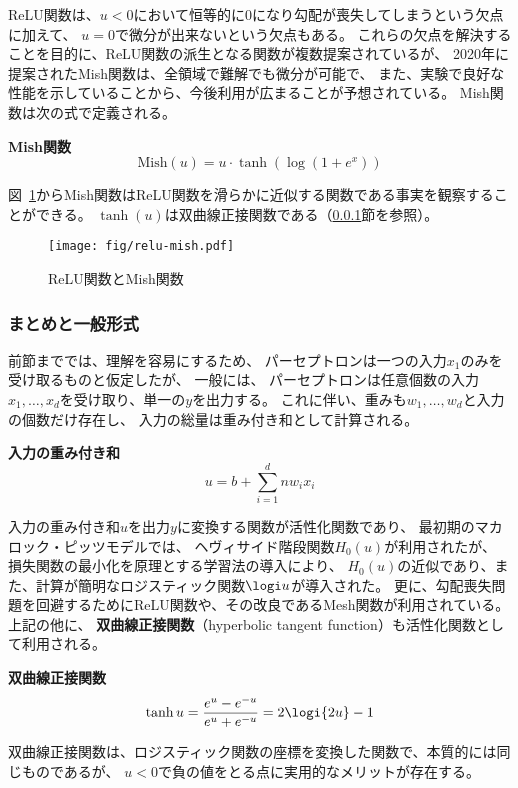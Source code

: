 ReLU関数は、$u < 0$において恒等的に0になり勾配が喪失してしまうという欠点に加えて、
$u = 0$で微分が出来ないという欠点もある。
これらの欠点を解決することを目的に、ReLU関数の派生となる関数が複数提案されているが、
2020年に提案されたMish関数は、全領域で難解でも微分が可能で、
また、実験で良好な性能を示していることから、今後利用が広まることが予想されている。
Mish関数は次の式で定義される。
\begin{itembox}{\bf Mish関数}
\[
  \mathrm{Mish}(u) = u \cdot \tanh\left(\log(1 + e^x)\right)
\]
\end{itembox}
図~\ref{fig:relu-mish}からMish関数はReLU関数を滑らかに近似する関数である事実を観察することができる。
$\tanh(u)$は双曲線正接関数である（\ref{sec:general}節を参照）。

\begin{figure}
  \centering
  \texttt{[image: fig/relu-mish.pdf]}
  \caption{ReLU関数とMish関数}
  \label{fig:relu-mish}
\end{figure}

\subsubsection{まとめと一般形式}
\label{sec:general}

前節まででは、理解を容易にするため、
パーセプトロンは一つの入力$x_1$のみを受け取るものと仮定したが、
一般には、
パーセプトロンは任意個数の入力$x_1, \dots, x_d$を受け取り、単一の$y$を出力する。
これに伴い、重みも$w_1, \dots, w_d$と入力の個数だけ存在し、
入力の総量は重み付き和として計算される。
\begin{itembox}{\bf 入力の重み付き和}
  \[
    u = b + \sum_{i=1}^dn w_i x_i
  \]
\end{itembox}
入力の重み付き和$u$を出力$y$に変換する関数が活性化関数であり、
最初期のマカロック・ピッツモデルでは、
ヘヴィサイド階段関数$H_0(u)$が利用されたが、
損失関数の最小化を原理とする学習法の導入により、
$H_0(u)$の近似であり、また、計算が簡明なロジスティック関数$\logi u$が導入された。
更に、勾配喪失問題を回避するためにReLU関数や、その改良であるMesh関数が利用されている。
上記の他に、
\textbf{双曲線正接関数}（hyperbolic tangent function）も活性化関数として利用される。
\begin{itembox}{\bf 双曲線正接関数}
  \[
    \tanh u = \frac{e^u - e^{-u}}{e^u + e^{-u}}
    = 2\logi{2u} - 1
  \]
\end{itembox}
双曲線正接関数は、ロジスティック関数の座標を変換した関数で、本質的には同じものであるが、
$u < 0$で負の値をとる点に実用的なメリットが存在する。

